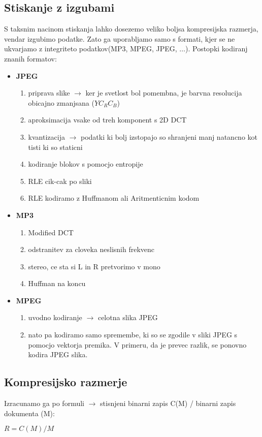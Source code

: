 \documentclass{article}
\begin{document}
\begin{multicols}{2}
	\subsection{Stiskanje z izgubami}
	S taksnim nacinom stiskanja lahko dosezemo veliko boljsa kompresijska razmerja, vendar izgubimo podatke.
	Zato ga uporabljamo samo s formati, kjer se ne ukvarjamo z integriteto podatkov(MP3, MPEG, JPEG, $\dots$).
	Postopki kodiranj znanih formatov:
	\begin{itemize}
		\item \textbf{JPEG}
		      \begin{enumerate}
			      \item priprava slike $\rightarrow$ ker je svetlost bol pomembna, je barvna resolucija obicajno zmanjsana ($YC_RC_B$)
			      \item aproksimacija vsake od treh komponent s 2D DCT
			      \item kvantizacija $\rightarrow$  podatki ki bolj izstopajo so shranjeni manj natancno kot tisti ki so staticni
			      \item kodiranje blokov s pomocjo entropije
			      \item RLE cik-cak po sliki
			      \item RLE kodiramo z Huffmanom ali Aritmenticnim kodom
		      \end{enumerate}
		\item \textbf{MP3}
		      \begin{enumerate}
			      \item Modified DCT
			      \item odstranitev za cloveka neslisnih frekvenc
			      \item stereo, ce sta si L in R pretvorimo v mono
			      \item Huffman na koncu
		      \end{enumerate}
		\item \textbf{MPEG}
		      \begin{enumerate}
			      \item uvodno kodiranje $\rightarrow$ celotna slika JPEG
			      \item nato pa kodiramo samo spremembe, ki so se zgodile v sliki JPEG s pomocjo vektorja premika. V
			            primeru, da je prevec razlik, se ponovno kodira JPEG slika.
		      \end{enumerate}
	\end{itemize}

	\subsection{Kompresijsko razmerje}
	Izracunamo ga po formuli $\rightarrow$ stisnjeni binarni zapis C(M) / binarni zapis dokumenta (M):
	\begin{center}
		\begin{math}
			R = C(M) / M
		\end{math}
	\end{center}


\end{multicols}
\end{document}
